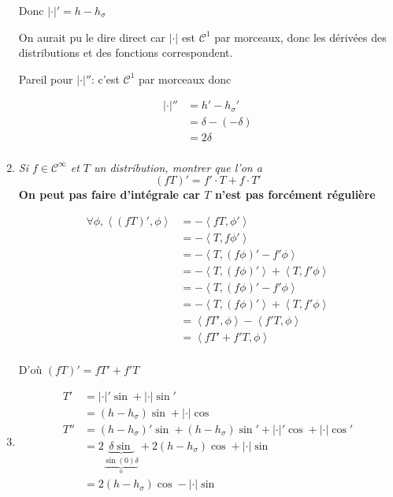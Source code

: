 \documentclass{article}
\newcommand{\cC}{\mathcal{C}}
\begin{document}
\begin{enumerate}
		Donc $| \cdot |' = h - h_{\sigma}$

		On aurait pu le dire direct car $| \cdot |$ est $\cC^1$ par morceaux, donc les dérivées des distributions et des fonctions correspondent. 

		Pareil pour $| \cdot |''$: c'est $\cC^1$ par morceaux donc

		\begin{align*}
			| \cdot |'' &= h' - h_\sigma' \\
			    &= \delta - (-\delta) \\
			    &= 2\delta \\
		\end{align*}

\item	
	\emph{Si $f \in \cC^{\infty}$ et $T$ un distribution, montrer que l'on a
	 \[
		 (fT)' = f' \cdot T + f \cdot T'
 \] }
	{\bf On peut pas faire d'intégrale car $T$ n'est pas forcément régulière}

	\begin{align*}
		\forall \phi, \left<(fT)', \phi \right> &= - \left<fT, \phi' \right> \\
		&= -\left<T, f\phi' \right> \\
		&= -\left<T, (f\phi)' - f'\phi \right> \\
		&= -\left<T, (f\phi)' \right> + \left<T, f'\phi \right> \\
		&= -\left<T, (f\phi)' - f' \phi \right> \\
		&= -\left<T, (f\phi)' \right> + \left<T, f'\phi \right> \\
		&= \left<fT', \phi \right> - \left<f'T, \phi \right> \\
		&= \left<fT' + f'T, \phi \right> \\
	\end{align*}

	D'où $(fT)' = fT' + f'T$

\item

	\begin{align*}
		T' &= | \cdot |' \sin + | \cdot | \sin' \\
		&= (h - h_\sigma) \sin + | \cdot | \cos \\
		T'' &= (h-h_\sigma)' \sin + (h-h_\sigma) \sin' + | \cdot |' \cos + | \cdot | \cos' \\
		    &= 2\underbrace{\delta \sin}_{\underbrace{\sin(0) \delta}_0} + 2(h-h_\sigma) \cos +  | \cdot | \sin \\
		    &= 2(h-h_\sigma) \cos - | \cdot | \sin \\
	\end{align*}
\end{enumerate}
\end{document}
